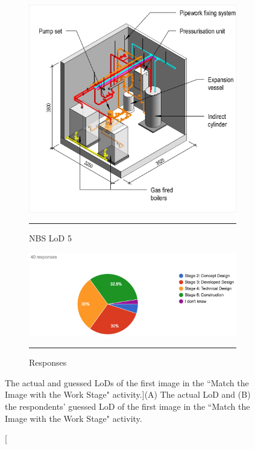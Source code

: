 \begin{figure}[htbp]
\centering
  \begin{subfigure}[b]{.35\textwidth}
  \centering
  \includegraphics[width=\textwidth]{figures/MTHW-heating-systems.jpg}
		\rule{\textwidth}{0.5pt} %
  \caption{NBS LoD 5}
  \label{}
\end{subfigure}
  \begin{subfigure}[b]{.61\textwidth}
  \centering
  \includegraphics[width=\textwidth]{figures/image1.png}
 		\rule{\textwidth}{0.5pt} %
  \caption{Responses}
  \label{}
\end{subfigure}
\caption[The actual and guessed LoDs of the first image in the ``Match the Image with the Work Stage" activity.]{({\scriptsize A}) The actual LoD and ({\scriptsize B}) the respondents’ guessed LoD of the first image in the ``Match the Image with the Work Stage" activity.}
\label{image1}
\end{figure}



